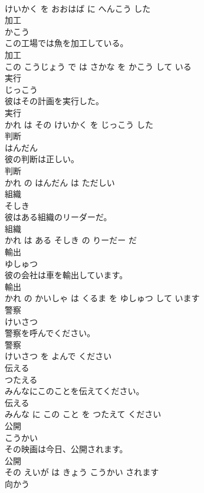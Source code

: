 \documentclass[8pt]{extreport}
\begin{document}
\begin{CJK}{UTF8}{min}
\\	けいかく を おおはば に へんこう した			
\\	加工	
\\	かこう			
\\	この工場では魚を加工している。	
\\	加工 
\\	この こうじょう で は さかな を かこう して いる			
\\	実行	
\\	じっこう			
\\	彼はその計画を実行した。	
\\	実行 
\\	かれ は その けいかく を じっこう した			
\\	判断	
\\	はんだん			
\\	彼の判断は正しい。	
\\	判断 
\\	かれ の はんだん は ただしい			
\\	組織	
\\	そしき			
\\	彼はある組織のリーダーだ。	
\\	組織 
\\	かれ は ある そしき の りーだー だ			
\\	輸出	
\\	ゆしゅつ			
\\	彼の会社は車を輸出しています。	
\\	輸出 
\\	かれ の かいしゃ は くるま を ゆしゅつ して います			
\\	警察	
\\	けいさつ			
\\	警察を呼んでください。	
\\	警察 
\\	けいさつ を よんで ください			
\\	伝える	
\\	つたえる			
\\	みんなにこのことを伝えてください。	
\\	伝える 
\\	みんな に この こと を つたえて ください			
\\	公開	
\\	こうかい			
\\	その映画は今日、公開されます。	
\\	公開 
\\	その えいが は きょう こうかい されます			
\\	向かう	

\end{CJK}
\end{document}
